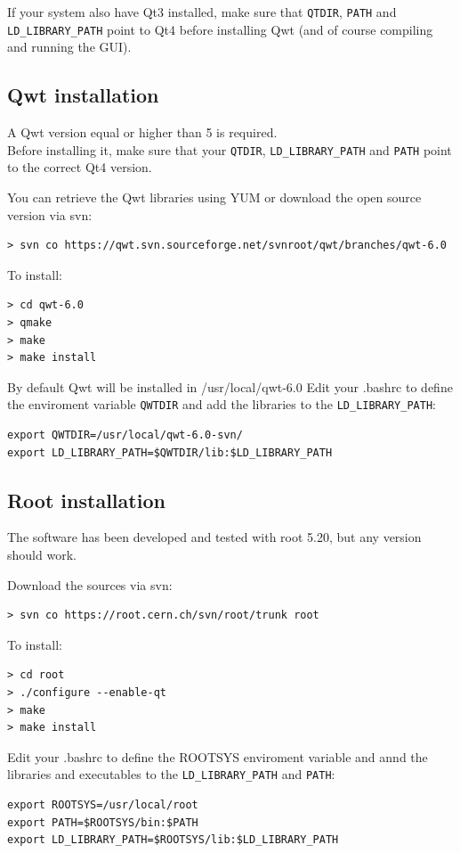 \documentclass{article}
\begin{document}
If your system also have Qt3 installed, make sure that  \verb=QTDIR=, \verb=PATH= and \verb=LD_LIBRARY_PATH= point to Qt4 before installing Qwt (and of course compiling and running the GUI).

\subsection{Qwt installation}
A Qwt version equal or higher than 5 is required.\\
Before installing it, make sure that your  \verb=QTDIR=, \verb=LD_LIBRARY_PATH= and \verb=PATH= point to the correct Qt4 version.

You can retrieve the Qwt libraries using YUM or download the open source version via svn:
\begin{verbatim}
> svn co https://qwt.svn.sourceforge.net/svnroot/qwt/branches/qwt-6.0
\end{verbatim}

To install:
\begin{verbatim}
> cd qwt-6.0
> qmake
> make
> make install
\end{verbatim}

By default Qwt will be installed in /usr/local/qwt-6.0
Edit your .bashrc to define the enviroment variable \verb=QWTDIR= and add the libraries to the \verb=LD_LIBRARY_PATH=:
\begin{verbatim}
export QWTDIR=/usr/local/qwt-6.0-svn/
export LD_LIBRARY_PATH=$QWTDIR/lib:$LD_LIBRARY_PATH
\end{verbatim}


\subsection{Root installation}

The software has been developed and tested with root 5.20, but any version should work.

Download the sources via svn:
\begin{verbatim}
> svn co https://root.cern.ch/svn/root/trunk root
\end{verbatim}

To install:
\begin{verbatim}
> cd root
> ./configure --enable-qt
> make
> make install
\end{verbatim}

Edit your .bashrc to define the ROOTSYS enviroment variable and annd the libraries and executables to the \verb=LD_LIBRARY_PATH= and \verb=PATH=:
\begin{verbatim}
export ROOTSYS=/usr/local/root
export PATH=$ROOTSYS/bin:$PATH
export LD_LIBRARY_PATH=$ROOTSYS/lib:$LD_LIBRARY_PATH
\end{verbatim}
\end{document}

